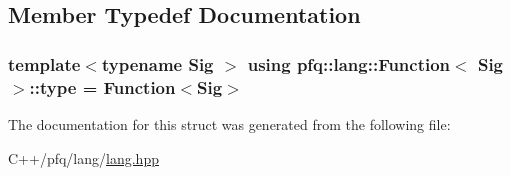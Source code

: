 \subsection{Member Typedef Documentation}
\hypertarget{structpfq_1_1lang_1_1Function_ac7124e473c4804e25b24e9e15fe7b392}{
\subsubsection[{type}]{\setlength{\rightskip}{0pt plus 5cm}template$<$typename Sig $>$ using {\bf pfq\+::lang\+::\+Function}$<$ Sig $>$\+::{\bf type} =  {\bf Function}$<$Sig$>$}}\label{structpfq_1_1lang_1_1Function_ac7124e473c4804e25b24e9e15fe7b392}


The documentation for this struct was generated from the following file\+:\begin{DoxyCompactItemize}
\item 
C++/pfq/lang/\hyperlink{lang_8hpp}{lang.\+hpp}\end{DoxyCompactItemize}
